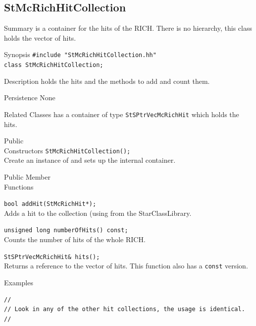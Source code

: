 \subsection{StMcRichHitCollection}
 
\label{sec:StMcRichHitCollection}
\begin{Entry}
\item[Summary]
     is a container for the
    hits of the RICH.  There is no hierarchy, this class holds
    the vector of hits.

\item[Synopsis]
    \verb+#include "StMcRichHitCollection.hh"+\\
    \verb+class StMcRichHitCollection;+\\

\item[Description]
     holds the hits and the methods to add and count them.

\item[Persistence]
    None

\item[Related Classes]
    has a container of type {\tt StSPtrVecMcRichHit} which holds the hits.

\item[Public\\ Constructors]
    \verb+StMcRichHitCollection();+\\
    Create an instance of 
    and sets up the internal container.

\item[Public Member\\ Functions]

    \verb+bool addHit(StMcRichHit*);+\\
    Adds a hit to the collection (using 
    from the StarClassLibrary.

    \verb+unsigned long numberOfHits() const;+\\
    Counts the number of hits of the whole RICH.

    \verb+StSPtrVecMcRichHit& hits();+\\
    Returns a reference to the vector of hits.  This function also has a \verb+const+ version.
    

\item[Examples]
{\footnotesize
\begin{verbatim}
//
// Look in any of the other hit collections, the usage is identical. 
//
\end{verbatim}
}%
\end{Entry}


